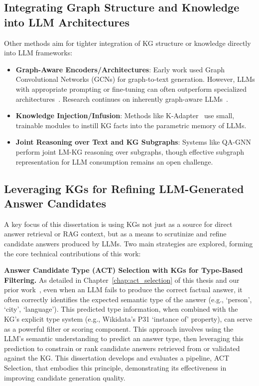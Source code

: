 \subsection{Integrating Graph Structure and Knowledge into LLM Architectures}
Other methods aim for tighter integration of KG structure or knowledge directly into LLM frameworks:
\begin{itemize}
    \item \textbf{Graph-Aware Encoders/Architectures}: Early work used Graph Convolutional Networks (GCNs) for graph-to-text generation. However, LLMs with appropriate prompting or fine-tuning can often outperform specialized architectures~\cite{iarosh-etal-2025-reducing, DBLP:conf/ijcai/0001LW0S0Y24}. Research continues on inherently graph-aware LLMs~\cite{liu-etal-2024-knowledge-graph, wen-etal-2024-mindmap}.
    \item \textbf{Knowledge Injection/Infusion}: Methods like K-Adapter~\cite{DBLP:journals/corr/abs-2002-01808} use small, trainable modules to instill KG facts into the parametric memory of LLMs.
    \item \textbf{Joint Reasoning over Text and KG Subgraphs}: Systems like QA-GNN~\cite{DBLP:conf/naacl/YasunagaRBLL21} perform joint LM-KG reasoning over subgraphs, though effective subgraph representation for LLM consumption remains an open challenge.
\end{itemize}

\subsection{Leveraging KGs for Refining LLM-Generated Answer Candidates}
A key focus of this dissertation is using KGs not just as a source for direct answer retrieval or RAG context, but as a means to scrutinize and refine candidate answers produced by LLMs. Two main strategies are explored, forming the core technical contributions of this work:

\textbf{Answer Candidate Type (ACT) Selection with KGs for Type-Based Filtering.}
\label{chap:related_work:act_selection_fusion}
As detailed in Chapter~\ref{chap:act_selection} of this thesis and our prior work~\cite{DBLP:conf/konvens/SalnikovLBRMP23-actselection}, even when an LLM fails to produce the correct factual answer, it often correctly identifies the expected semantic type of the answer (e.g., `person', `city', `language'). This predicted type information, when combined with the KG's explicit type system (e.g., Wikidata's P31 `instance of' property), can serve as a powerful filter or scoring component. This approach involves using the LLM's semantic understanding to predict an answer type, then leveraging this prediction to constrain or rank candidate answers retrieved from or validated against the KG. This dissertation develops and evaluates a pipeline, ACT Selection, that embodies this principle, demonstrating its effectiveness in improving candidate generation quality.

